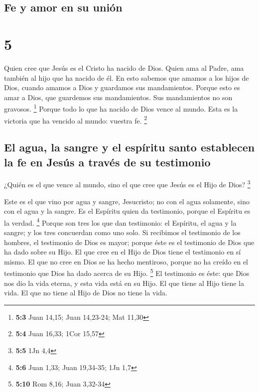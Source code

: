 \hypertarget{fe-y-amor-en-su-uniuxf3n}{%
\subsection{Fe y amor en su unión}\label{fe-y-amor-en-su-uniuxf3n}}

\hypertarget{section-4}{%
\section{5}\label{section-4}}

 Quien cree que Jesús es el Cristo ha nacido de Dios.
Quien ama al Padre, ama también al hijo que ha nacido de él.
 En esto sabemos que amamos a los hijos de Dios, cuando
amamos a Dios y guardamos sus mandamientos.  Porque esto
es amar a Dios, que guardemos sus mandamientos. Sus mandamientos no son
gravosos. \footnote{\textbf{5:3} Juan 14,15; Juan 14,23-24; Mat 11,30}
 Porque todo lo que ha nacido de Dios vence al mundo. Esta
es la victoria que ha vencido al mundo: vuestra fe. \footnote{\textbf{5:4}
  Juan 16,33; 1Cor 15,57}

\hypertarget{el-agua-la-sangre-y-el-espuxedritu-santo-establecen-la-fe-en-jesuxfas-a-travuxe9s-de-su-testimonio}{%
\subsection{El agua, la sangre y el espíritu santo establecen la fe en
Jesús a través de su
testimonio}\label{el-agua-la-sangre-y-el-espuxedritu-santo-establecen-la-fe-en-jesuxfas-a-travuxe9s-de-su-testimonio}}

 ¿Quién es el que vence al mundo, sino el que cree que
Jesús es el Hijo de Dios? \footnote{\textbf{5:5} 1Jn 4,4}

 Este es el que vino por agua y sangre, Jesucristo; no con
el agua solamente, sino con el agua y la sangre. Es el Espíritu quien da
testimonio, porque el Espíritu es la verdad. \footnote{\textbf{5:6} Juan
  1,33; Juan 19,34-35; 1Jn 1,7}  Porque son tres los que
dan testimonio:  el Espíritu, el agua y la sangre; y los
tres concuerdan como uno solo.  Si recibimos el testimonio
de los hombres, el testimonio de Dios es mayor; porque éste es el
testimonio de Dios que ha dado sobre su Hijo.  El que
cree en el Hijo de Dios tiene el testimonio en sí mismo. El que no cree
en Dios se ha hecho mentiroso, porque no ha creído en el testimonio que
Dios ha dado acerca de su Hijo. \footnote{\textbf{5:10} Rom 8,16; Juan
  3,32-34}  El testimonio es éste: que Dios nos dio la
vida eterna, y esta vida está en su Hijo.  El que tiene
al Hijo tiene la vida. El que no tiene al Hijo de Dios no tiene la vida.

